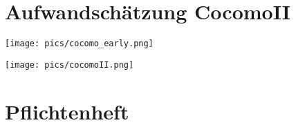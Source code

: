 \section{Aufwandschätzung CocomoII}
\begin{center}
\texttt{[image: pics/cocomo\_early.png]}
\end{center}

\texttt{[image: pics/cocomoII.png]}

\section{Pflichtenheft}